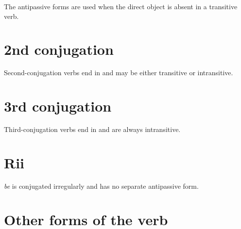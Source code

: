 \documentclass{book}
\begin{document}

The antipassive forms are used when the direct object is absent in a transitive verb.

\section{2nd conjugation}

Second-conjugation verbs end in  and may be either transitive or intransitive.


\section{3rd conjugation}

Third-conjugation verbs end in  and are always intransitive.


\section{Rii}

 \emph{be} is conjugated irregularly and has no separate antipassive form.


\section{Other forms of the verb}
\end{document}
